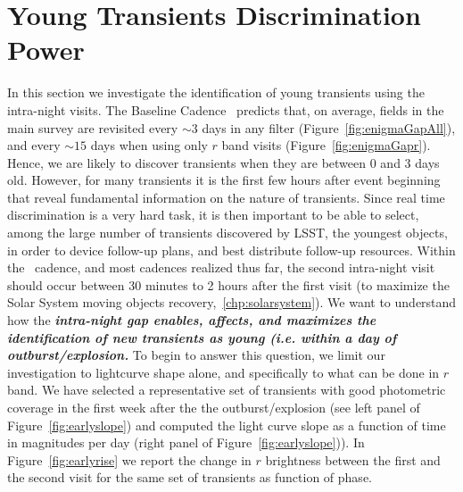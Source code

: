 
%
%
%
%
%
%
%
%

\section{Young Transients Discrimination Power}
\def\secname{transientsAge}\label{sec:\secname} %


In this section we investigate the identification of young transients using the intra-night visits. The Baseline Cadence~ predicts that, on average, fields in the main survey are revisited every $\sim3$ days in any filter (Figure~\ref{fig:enigmaGapAll}), and every $\sim15$ days when using only $r$ band visits (Figure~\ref{fig:enigmaGapr}).  Hence, we are likely to discover transients when they are between 0 and 3 days old. However, for many transients it is the first few hours after event beginning that reveal fundamental information on the nature of transients. Since real time discrimination is a very hard task, it is then important to be able to select, among the large number of transients discovered by LSST, the youngest objects, in order to device follow-up plans, and best distribute follow-up resources. Within the~ cadence, and most cadences realized thus far, the second intra-night visit should occur between 30 minutes to 2 hours after the first visit (to maximize the Solar System moving objects recovery,~\ref{chp:solarsystem}). We want to understand how the {\bf\emph{intra-night gap enables, affects, and maximizes the identification of new transients as young (i.e. within a day of outburst/explosion.}}
To begin to answer this question, we limit our investigation to lightcurve shape alone, and specifically to what can be done in $r$ band. We have selected a representative set of transients with good photometric coverage in the first week after the the outburst/explosion (see left panel of Figure~\ref{fig:earlyslope}) and computed the light curve slope as a function of time in magnitudes per day (right panel of Figure~\ref{fig:earlyslope})). In Figure~\ref{fig:earlyrise} we report the change in $r$ brightness between the first and the second visit for the same set of transients as function of phase.

